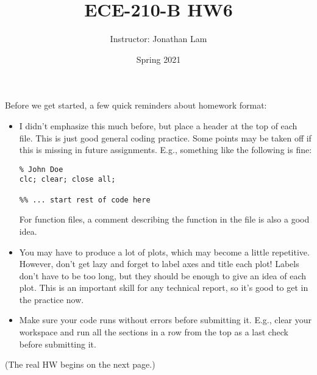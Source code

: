 \documentclass{article}
\title{ECE-210-B HW6}
\author{Instructor: Jonathan Lam}
\date{Spring 2021}
\begin{document}
	\maketitle
	
	\noindent Before we get started, a few quick reminders about homework format:
	\begin{itemize}
		\item I didn't emphasize this much before, but place a header at the top of each file. This is just good general coding practice. Some points may be taken off if this is missing in future assignments. E.g., something like the following is fine:
		\begin{lstlisting}[style=Matlab-editor]
% ECE210B HW6
% John Doe
clc; clear; close all;

%% ... start rest of code here
		\end{lstlisting}
		For function files, a comment describing the function in the file is also a good idea.
		
		\item You may have to produce a lot of plots, which may become a little repetitive. However, don't get lazy and forget to label axes and title each plot! Labels don't have to be too long, but they should be enough to give an idea of each plot. This is an important skill for any technical report, so it's good to get in the practice now.
		
		\item Make sure your code runs without errors before submitting it. E.g., clear your workspace and run all the sections in a row from the top as a last check before submitting it.
	\end{itemize}
	(The real HW begins on the next page.)
\end{document}
